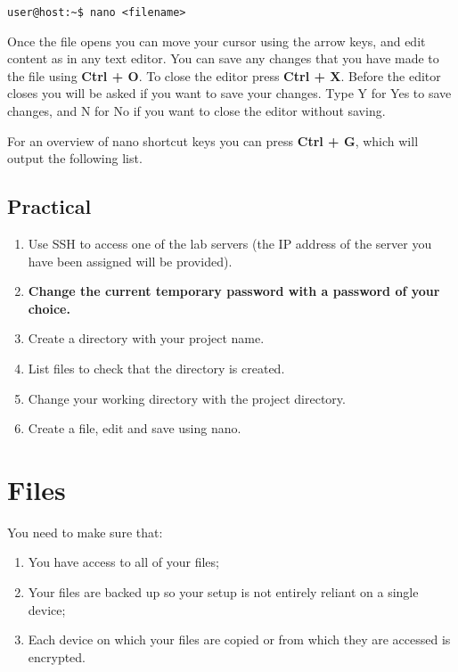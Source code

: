 \documentclass[
]{book}
\providecommand{\tightlist}{%
  \setlength{\itemsep}{0pt}\setlength{\parskip}{0pt}}
\begin{document}
\begin{verbatim}
user@host:~$ nano <filename>
\end{verbatim}

Once the file opens you can move your cursor using the arrow keys, and edit content
as in any text editor. You can save any changes that you have made to the file
using \textbf{Ctrl + O}. To close the editor press \textbf{Ctrl + X}. Before the editor
closes you will be asked if you want to save your changes. Type Y for Yes to
save changes, and N for No if you want to close the editor without saving.

For an overview of nano shortcut keys you can press \textbf{Ctrl + G}, which will output the following list.

\hypertarget{practical}{%
\section{Practical}\label{practical}}

\begin{enumerate}
\def\labelenumi{\arabic{enumi})}
\item
  Use SSH to access one of the lab servers (the IP address of the server you have been assigned will be provided).
\item
  \textbf{Change the current temporary password with a password of your choice.}
\item
  Create a directory with your project name.
\item
  List files to check that the directory is created.
\item
  Change your working directory with the project directory.
\item
  Create a file, edit and save using nano.
\end{enumerate}

\hypertarget{files}{%
\chapter{Files}\label{files}}

You need to make sure that:

\begin{enumerate}
\def\labelenumi{\alph{enumi})}
\tightlist
\item
  You have access to all of your files;
\item
  Your files are backed up so your setup is not entirely reliant on a single device;
\item
  Each device on which your files are copied or from which they are accessed
  is encrypted.
\end{enumerate}
\end{document}
